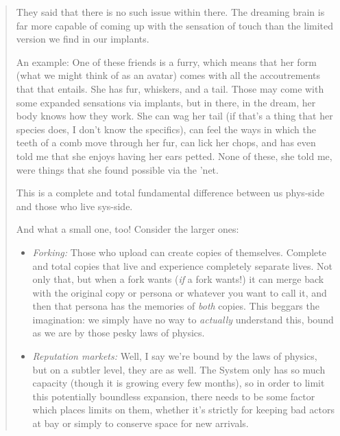 \begin{quote}
They said that there is no such issue within there. The dreaming brain is far more capable of coming up with the sensation of touch than the limited version we find in our implants.

An example: One of these friends is a furry, which means that her form (what we might think of as an avatar) comes with all the accoutrements that that entails. She has fur, whiskers, and a tail. Those may come with some expanded sensations via implants, but in there, in the dream, her body knows how they work. She can wag her tail (if that's a thing that her species does, I don't know the specifics), can feel the ways in which the teeth of a comb move through her fur, can lick her chops, and has even told me that she enjoys having her ears petted. None of these, she told me, were things that she found possible via the 'net.

This is a complete and total fundamental difference between us phys-side and those who live sys-side.

And what a small one, too! Consider the larger ones:

\begin{itemize}
\item
  \emph{Forking:} Those who upload can create copies of themselves. Complete and total copies that live and experience completely separate lives. Not only that, but when a fork wants (\emph{if} a fork wants!) it can merge back with the original copy or persona or whatever you want to call it, and then that persona has the memories of \emph{both} copies. This beggars the imagination: we simply have no way to \emph{actually} understand this, bound as we are by those pesky laws of physics.
\item
  \emph{Reputation markets:} Well, I say we're bound by the laws of physics, but on a subtler level, they are as well. The System only has so much capacity (though it is growing every few months), so in order to limit this potentially boundless expansion, there needs to be some factor which places limits on them, whether it's strictly for keeping bad actors at bay or simply to conserve space for new arrivals.


\end{itemize}
\end{quote}
